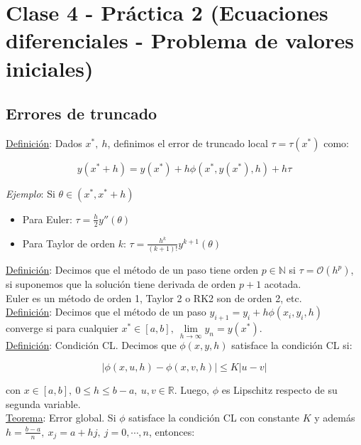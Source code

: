 \section{Clase 4 - Pr\'actica 2 (Ecuaciones diferenciales - Problema de valores iniciales)}

\subsection{Errores de truncado}

\underline{Definici\'on}: Dados $x^{*},\ h$, definimos el error de truncado local $\tau = \tau(x^{*})$ como:

$$y(x^{*} + h) = y(x^{*}) + h\phi(x^{*}, y(x^{*}), h) + h\tau$$

\textit{Ejemplo}: Si $\theta \in (x^{*}, x^{*} + h)$

\begin{itemize}
	\item Para Euler: $\tau = \frac{h}{2}y''(\theta)$
	
	\item Para Taylor de orden $k$: $\tau = \frac{h^{k}}{(k + 1)!}y^{k + 1}(\theta)$
\end{itemize}

\underline{Definici\'on}: Decimos que el m\'etodo de un paso tiene orden $p \in \mathbb{N}$ si $\tau = \mathcal{O}(h^{p})$, si suponemos que la soluci\'on tiene derivada de orden $p + 1$ acotada.\\

Euler es un m\'etodo de orden 1, Taylor 2 o RK2 son de orden 2, etc.\\

\underline{Definici\'on}: Decimos que el m\'etodo de un paso $y_{i + 1} = y_{i} + h\phi(x_{i}, y_{i}, h)$ converge si para cualquier $x^{*} \in [a, b],\ \lim \limits_{h \rightarrow \infty} y_{n} = y(x^{*})$.\\

\underline{Definici\'on}: Condici\'on CL. Decimos que $\phi(x, y, h)$ satisface la condici\'on CL si:

$$|\phi(x, u, h) - \phi(x, v, h)| \leq K|u - v|$$

con $x \in [a, b],\ 0 \leq h \leq b - a,\ u, v \in \mathbb{R}$. Luego, $\phi$ es Lipschitz respecto de su segunda variable.\\

\underline{Teorema}: Error global. Si $\phi$ satisface la condici\'on CL con constante $K$ y adem\'as $h = \frac{b - a}{n},\ x_{j} = a + hj,\ j = 0, \cdots, n$, entonces:

